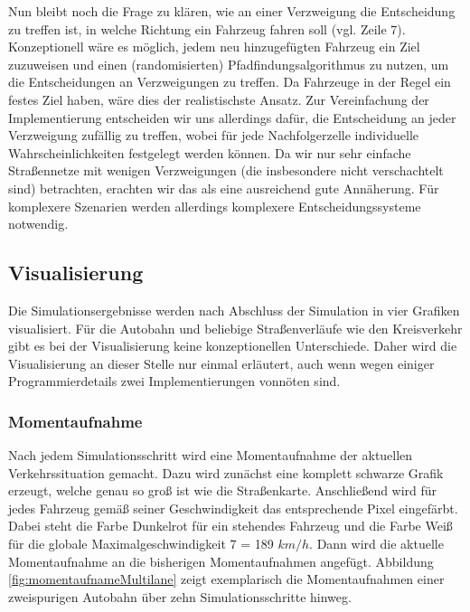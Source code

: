 \documentclass[10pt, a4paper]{article}
\begin{document}
Nun bleibt noch die Frage zu klären, wie an einer Verzweigung die Entscheidung zu treffen ist, in welche Richtung ein Fahrzeug fahren soll (vgl. Zeile 7). Konzeptionell wäre es möglich, jedem neu hinzugefügten Fahrzeug ein Ziel zuzuweisen und einen (randomisierten) Pfadfindungsalgorithmus zu nutzen, um die Entscheidungen an Verzweigungen zu treffen. Da Fahrzeuge in der Regel ein festes Ziel haben, wäre dies der realistischste Ansatz. Zur Vereinfachung der Implementierung entscheiden wir uns allerdings dafür, die Entscheidung an jeder Verzweigung zufällig zu treffen, wobei für jede Nachfolgerzelle individuelle Wahrscheinlichkeiten festgelegt werden können. Da wir nur sehr einfache Straßennetze mit wenigen Verzweigungen (die insbesondere nicht verschachtelt sind) betrachten, erachten wir das als eine ausreichend gute Annäherung. Für komplexere Szenarien werden allerdings komplexere Entscheidungssysteme notwendig.


\subsection{Visualisierung}
\label{subsec:visualisierung}
Die Simulationsergebnisse werden nach Abschluss der Simulation in vier Grafiken visualisiert. Für die Autobahn und beliebige Straßenverläufe wie den Kreisverkehr gibt es bei der Visualisierung keine konzeptionellen Unterschiede. Daher wird die Visualisierung an dieser Stelle nur einmal erläutert, auch wenn wegen einiger Programmierdetails zwei Implementierungen vonnöten sind.

\subsubsection{Momentaufnahme}
\label{subsubsec:momentaufnahme}

Nach jedem Simulationsschritt wird eine Momentaufnahme der aktuellen Verkehrssituation gemacht. Dazu wird zunächst eine komplett schwarze Grafik erzeugt, welche genau so groß ist wie die Straßenkarte. Anschließend wird für jedes Fahrzeug gemäß seiner Geschwindigkeit das entsprechende Pixel eingefärbt. Dabei steht die Farbe Dunkelrot für ein stehendes Fahrzeug und die Farbe Weiß für die globale Maximalgeschwindigkeit 7 = 189 $km/h$. Dann wird die aktuelle Momentaufnahme an die bisherigen Momentaufnahmen angefügt. Abbildung \ref{fig:momentaufnameMultilane} zeigt exemplarisch die Momentaufnahmen einer zweispurigen Autobahn über zehn Simulationsschritte hinweg.
\end{document}
